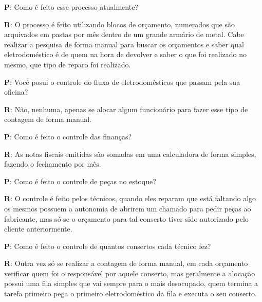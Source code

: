 \documentclass[a4paper,10pt]{article}
\begin{document}
\begin{framed}

\textbf{P}: Como é feito esse processo atualmente?

\textbf{R}: O processo é feito utilizando blocos de orçamento, numerados que são arquivados em pastas por mês dentro de um grande armário de metal. Cabe realizar a pesquisa de forma manual para buscar os orçamentos e saber qual eletrodoméstico é de quem na hora de devolver e saber o que foi realizado no mesmo, que tipo de reparo foi realizado.
\end{framed}

\begin{framed}

\textbf{P}: Você posui o controle do fluxo de eletrodomésticos que passam pela sua oficina?

\textbf{R}: Não, nenhuma, apenas se alocar algum funcionário para fazer esse tipo de contagem de forma manual.
\end{framed}

\begin{framed}

\textbf{P}: Como é feito o controle das finanças?

\textbf{R}: As notas fiscais emitidas são somadas em uma calculadora de forma simples, fazendo o fechamento por mês. 
\end{framed}

\begin{framed}
\textbf{P}: Como é feito o controle de peças no estoque?

\textbf{R}: O controle é feito pelos técnicos, quando eles reparam que está faltando algo os mesmos possuem a autonomia de abrirem um chamado para pedir peças ao fabricante, mas só se o orçamento para tal conserto tiver sido autorizado pelo cliente anteriormente.
\end{framed}

\begin{framed}

\textbf{P}: Como é feito o controle de quantos consertos cada técnico fez?

\textbf{R}: Outra vez só se realizar a contagem de forma manual, em cada orçamento verificar quem foi o responsável por aquele conserto, mas geralmente a alocação possui uma fila simples que vai sempre para o mais desocupado, quem termina a tarefa primeiro pega o primeiro eletrodoméstico da fila e executa o seu conserto.
\end{framed}
\end{document}
